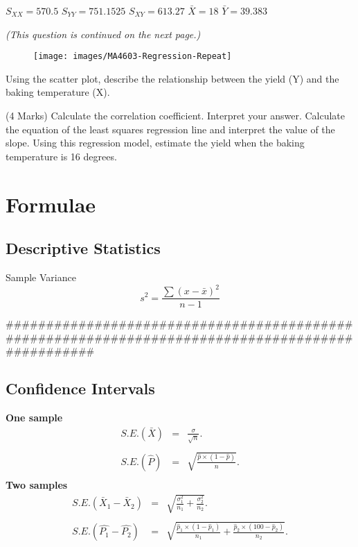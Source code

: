 \begin{multicols}{3}
	\begin{itemize}
	 $S_{XX} = 570.5$
	 $S_{YY} =  751.1525$
	 $S_{XY} = 613.27$
	 $\bar{X} = 18$
	 $\bar{Y} = 39.383$
	\end{itemize}
\end{multicols}
\medskip
\textit{(This question is continued on the next page.)}
\newpage

\begin{figure}
\centering
\texttt{[image: images/MA4603-Regression-Repeat]}
\caption{}
\label{fig:ma4603-regression-repeat}
\end{figure}
\medskip
\begin{enumerate}[(i)]
	
  Using the scatter plot, describe the relationship between the yield (Y) and the baking temperature (X).
	
	
	
	
	
 (4 Marks) Calculate the correlation coefficient. Interpret your answer.
  Calculate the equation of the least squares regression line and interpret the value of the slope.
  Using this regression model, estimate the yield when the baking temperature is 16 degrees.
\end{enumerate}

\newpage


\section*{Formulae}
\subsection*{Descriptive Statistics}
\begin{itemize}
 Sample Variance
	\begin{equation*}
	s^2 = \frac{\sum (x-\bar{x})^2}{n-1}
	\end{equation*}
\end{itemize}
#################################################################################################
\subsection*{Confidence Intervals}
{\bf One sample}
\begin{eqnarray*} S.E.(\bar{X})&=&\frac{\sigma}{\sqrt{n}}.\\\\
	S.E.(\hat{P})&=&\sqrt{\frac{\hat{p}\times(1-\hat{p})}{n}}.\\
\end{eqnarray*}
{\bf Two samples}
\begin{eqnarray*}
	S.E.(\bar{X}_1-\bar{X}_2)&=&\sqrt{\frac{\sigma^2_1}{n_1}+\frac{\sigma_2^2}{n_2}}.\\\\
	S.E.(\hat{P_1}-\hat{P_2})&=&\sqrt{\frac{\hat{p}_1\times(1-\hat{p}_1)}{n_1}+\frac{\hat{p}_2\times(100-\hat{p}_2)}{n_2}}.\\\\
\end{eqnarray*}
